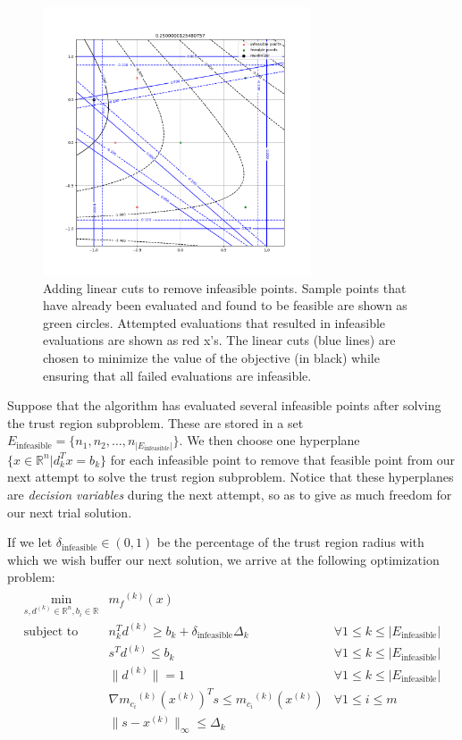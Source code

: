 \documentclass{article}
\theoremstyle{case}
\newcommand{\xk}{{x^{(k)}}}
\newcommand{\Rn}{\mathbb R^n}
\newcommand{\reals}{\mathbb R}
\newcommand{\dk}{\Delta_k}
\newcommand{\mfk}{{{m}_f}^{(k)}}
\newcommand{\mcik}{{{m}_{c_i}}^{(k)}}
\newcommand{\trsinfset}{{E_\text{infeasible}}}
\newcommand{\trstol}{{\delta_\text{infeasible}}}
\begin{document}
\begin{figure}[h]
    \centering
    \includegraphics[width=300px]{images/pyomo_cut_solution.png}
    \caption{
		Adding linear cuts to remove infeasible points.
		Sample points that have already been evaluated and found to be feasible are shown as green circles.
		Attempted evaluations that resulted in infeasible evaluations are shown as red x's.
		The linear cuts (blue lines) are chosen to minimize the value of the objective (in black) while ensuring that all failed evaluations are infeasible.
	}
    \label{pvip}
\end{figure}


Suppose that the algorithm has evaluated several infeasible points after solving the trust region subproblem.
These are stored in a set $\trsinfset = \{n_1, n_2, \ldots, n_{|\trsinfset|}\}$.
We then choose one hyperplane $\{x \in \Rn | d_k^Tx = b_k\}$ for each infeasible point to remove that feasible point from our next attempt to solve the trust region subproblem.
Notice that these hyperplanes are \emph{decision variables} during the next attempt, so as to give as much freedom for our next trial solution.

If we let $\trstol \in (0, 1)$ be the percentage of the trust region radius with which we wish buffer our next solution, 
we arrive at the following optimization problem:
\begin{align}
\label{buffered_trust_region_subproblem}
\begin{array}{ccc}
\min_{s, d^{(k)} \in \Rn, b_i \in \reals}	& \mfk(x) & 	\\
 \mbox{subject to}  & n_k^Td^{(k)} \ge b_k + \trstol \dk& \forall 1 \le k \le |\trsinfset | \\
 & s^T d^{(k)} \le b_k &   \forall 1 \le k \le |\trsinfset |  \\
 & \|d^{(k)}\| = 1 & \forall 1 \le k \le |\trsinfset |	\\
 & \nabla \mcik(\xk) ^T s \le \mcik(\xk) & \forall 1 \le i \le m\\
 & \|s - \xk \|_{\infty} \le \dk & \\
\end{array}
\end{align}
\end{document}

